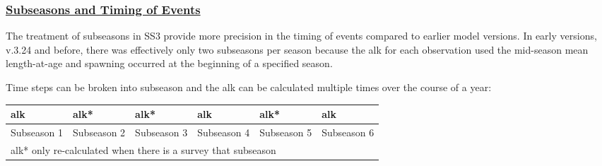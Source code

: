 \hypertarget{SubSeas}{}
\subsubsection[Subseasons and Timing of Events]{\protect\hyperlink{SubSeas}{Subseasons and Timing of Events}}
The treatment of subseasons in SS3 provide more precision in the timing of events compared to earlier model versions. In early versions, v.3.24 and before, there was effectively only two subseasons per season because the \gls{alk} for each observation used the mid-season mean length-at-age and spawning occurred at the beginning of a specified season.  

Time steps can be broken into subseason and the \gls{alk} can be calculated multiple times over the course of a year:
\vspace*{-\baselineskip}
\begin{center}
	\begin{tabular}{|p{2.37cm}|p{2.37cm}|p{2.37cm}|p{2.37cm}|p{2.37cm}|p{2.37cm}|}
		\hline
		\gls{alk} & \gls{alk}* & \gls{alk}* & \gls{alk} & \gls{alk}* & \gls{alk} \Tstrut\Bstrut\\
		\hline
		Subseason 1 & Subseason 2 & Subseason 3 & Subseason 4 & Subseason 5 & Subseason 6 \Tstrut\Bstrut\\		
		\hline
		\multicolumn{6}{l}{\gls{alk}* only re-calculated when there is a survey that subseason} \Tstrut\Bstrut\\			
	\end{tabular}
\end{center}

